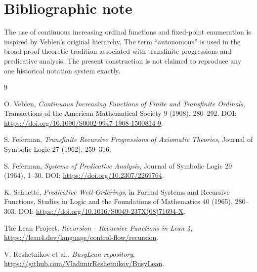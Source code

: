 \documentclass[11pt]{article}
\theoremstyle{definition}
\theoremstyle{remark}
\begin{document}
\section{Bibliographic note}

The use of continuous increasing ordinal functions and fixed-point enumeration
is inspired by Veblen's original hierarchy.  The term ``autonomous'' is used in
the broad proof-theoretic tradition associated with transfinite progressions and
predicative analysis.  The present construction is not claimed to reproduce any
one historical notation system exactly.

\begin{thebibliography}{9}

O. Veblen,
\emph{Continuous Increasing Functions of Finite and Transfinite Ordinals},
Transactions of the American Mathematical Society 9 (1908), 280--292.
DOI: \url{https://doi.org/10.1090/S0002-9947-1908-1500814-9}.

S. Feferman,
\emph{Transfinite Recursive Progressions of Axiomatic Theories},
Journal of Symbolic Logic 27 (1962), 259--316.

S. Feferman,
\emph{Systems of Predicative Analysis},
Journal of Symbolic Logic 29 (1964), 1--30.
DOI: \url{https://doi.org/10.2307/2269764}.

K. Schuette,
\emph{Predicative Well-Orderings},
in Formal Systems and Recursive Functions, Studies in Logic and the
Foundations of Mathematics 40 (1965), 280--303.
DOI: \url{https://doi.org/10.1016/S0049-237X(08)71694-X}.

The Lean Project,
\emph{Recursion - Recursive Functions in Lean 4},
\url{https://lean4.dev/language/control-flow/recursion}.

V. Reshetnikov et al.,
\emph{BusyLean repository},
\url{https://github.com/VladimirReshetnikov/BusyLean}.

\end{thebibliography}
\end{document}

